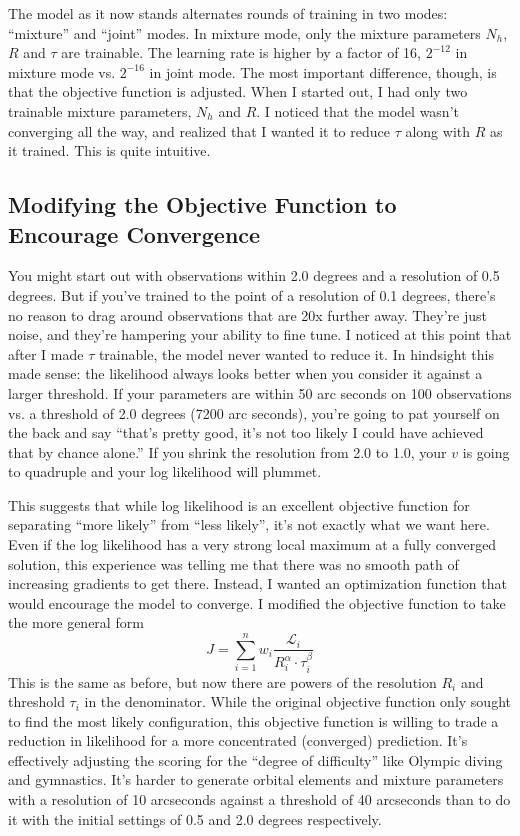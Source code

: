 The model as it now stands alternates rounds of training in two modes: ``mixture'' and ``joint'' modes.
In mixture mode, only the mixture parameters $N_h$, $R$ and $\tau$ are trainable.
The learning rate is higher by a factor of 16, $2^{-12}$ in mixture mode vs. $2^{-16}$ in joint mode.
The most important difference, though, is that the objective function is adjusted.
When I started out, I had only two trainable mixture parameters, $N_h$ and $R$.
I noticed that the model wasn't converging all the way, and realized that I wanted it to reduce $\tau$ along with $R$ as it trained.
This is quite intuitive.  

\subsection{Modifying the Objective Function to Encourage Convergence}
You might start out with observations within 2.0 degrees and a resolution of 0.5 degrees.
But if you've trained to the point of a resolution of 0.1 degrees, there's no reason to drag around observations that are 20x further away.
They're just noise, and they're hampering your ability to fine tune.
I noticed at this point that after I made $\tau$ trainable, the model never wanted to reduce it.
In hindsight this made sense: the likelihood always looks better when you consider it against a larger threshold.
If your parameters are within 50 arc seconds on 100 observations vs. a threshold of 2.0 degrees (7200 arc seconds), 
you're going to pat yourself on the back and say ``that's pretty good, it's not too likely I could have achieved that by chance alone.''
If you shrink the resolution from 2.0 to 1.0, your $v$ is going to quadruple and your log likelihood will plummet.

This suggests that while log likelihood is an excellent objective function for separating ``more likely'' from ``less likely'', it's not exactly what we want here.
Even if the log likelihood has a very strong local maximum at a fully converged solution,
this experience was telling me that there was no smooth path of increasing gradients to get there.
Instead, I wanted an optimization function that would encourage the model to converge.
I modified the objective function to take the more general form
$$J = \sum_{i=1}^{n} w_i \frac{\mathcal{L}_i}{R_i^\alpha \cdot \tau_i^\beta}$$
This is the same as before, but now there are powers of the resolution $R_i$ and threshold $\tau_i$ in the denominator.
While the original objective function only sought to find the most likely configuration,
this objective function is willing to trade a reduction in likelihood for a more concentrated (converged) prediction.
It's effectively adjusting the scoring for the ``degree of difficulty'' like Olympic diving and gymnastics.
It's harder to generate orbital elements and mixture parameters with a resolution of 10 arcseconds against a threshold of 40 arcseconds
than to do it with the initial settings of 0.5 and 2.0 degrees respectively.

